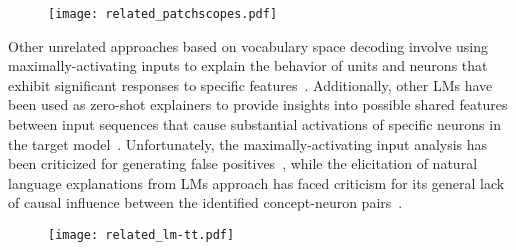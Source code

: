 \begin{figure}[t!]
    \centering
    \texttt{[image: related\_patchscopes.pdf]}
    \caption{}
    \label{fig:related_patchscopes}
\end{figure}


Other unrelated approaches based on vocabulary space decoding involve using maximally-activating inputs to explain the behavior of units and neurons that exhibit significant responses to specific features~\cite{dalvi2019}.
Additionally, other LMs have been used as zero-shot explainers to provide insights into possible shared features between input sequences that cause substantial activations of specific neurons in the target model~\cite{bills2023}.
Unfortunately, the maximally-activating input analysis has been criticized for generating false positives~\cite{bolukbasi2021}, while the elicitation of natural language explanations from LMs approach has faced criticism for its general lack of causal influence between the identified concept-neuron pairs~\cite{huang2023}.


\begin{figure}[t!]
    \centering
    \texttt{[image: related\_lm-tt.pdf]}
    \caption{}
    \label{fig:related_lm-tt}
\end{figure}